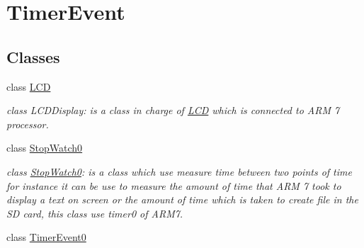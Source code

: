 \hypertarget{group__group1}{
\section{TimerEvent}
\label{group__group1}
}
\subsection*{Classes}
\begin{DoxyCompactItemize}
\item 
class \hyperlink{class_l_c_d}{LCD}
\begin{DoxyCompactList}\small\item\em class LCDDisplay: is a class in charge of \hyperlink{class_l_c_d}{LCD} which is connected to ARM 7 processor. \end{DoxyCompactList}\item 
class \hyperlink{class_stop_watch0}{StopWatch0}
\begin{DoxyCompactList}\small\item\em class \hyperlink{class_stop_watch0}{StopWatch0}: is a class which use measure time between two points of time for instance it can be use to measure the amount of time that ARM 7 took to display a text on screen or the amount of time which is taken to create file in the SD card, this class use timer0 of ARM7. \end{DoxyCompactList}\item 
class \hyperlink{class_timer_event0}{TimerEvent0}
\end{DoxyCompactItemize}
